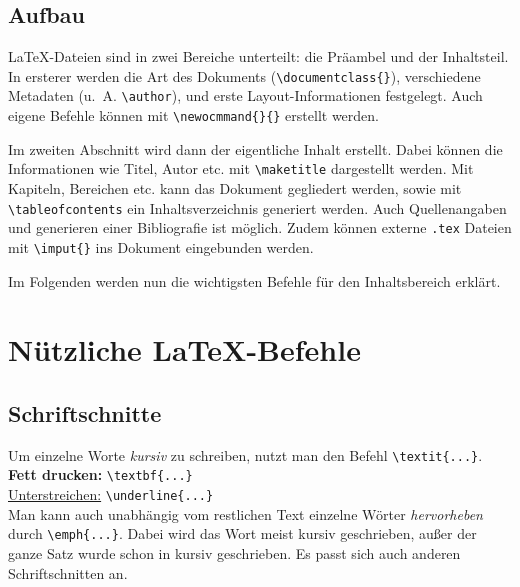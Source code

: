 \documentclass[ngerman]{scrreport}
\begin{document}
\section{Aufbau}

\LaTeX-Dateien sind in zwei Bereiche unterteilt: die Präambel und der Inhaltsteil. In ersterer werden die Art des Dokuments ({\color{blue}\verb|\documentclass{}|}), verschiedene Metadaten (u.~A. {\color{blue}\verb|\author|}), und erste Layout-Informationen festgelegt.
Auch eigene Befehle können mit {\color{blue}\verb|\newocmmand{}{}|} erstellt werden.

Im zweiten Abschnitt wird dann der eigentliche Inhalt erstellt. Dabei können die Informationen wie Titel, Autor etc. mit {\color{blue}\verb|\maketitle|} dargestellt werden. Mit Kapiteln, Bereichen etc. kann das Dokument gegliedert werden, sowie mit {\color{blue}\verb|\tableofcontents|} ein Inhaltsverzeichnis generiert werden.
Auch Quellenangaben und generieren einer Bibliografie ist möglich. Zudem können externe \texttt{.tex} Dateien mit {\color{blue}\verb|\imput{}|} ins Dokument eingebunden werden.

Im Folgenden werden nun die wichtigsten Befehle für den Inhaltsbereich erklärt.

\chapter{\centering Nützliche \LaTeX{}-Befehle}

\section{Schriftschnitte}
Um einzelne Worte \textit{kursiv} zu schreiben, nutzt man den Befehl {\color{blue}\verb|\textit{...}|}.\\
\textbf{Fett drucken:} {\color{blue}\verb|\textbf{...}|}\\
\underline{Unterstreichen:} {\color{blue}\verb|\underline{...}|}\\
Man kann auch unabhängig vom restlichen Text einzelne Wörter \emph{hervorheben} durch {\color{blue}\verb|\emph{...}|}. Dabei wird das Wort meist kursiv geschrieben, außer der ganze Satz wurde schon in kursiv geschrieben. Es passt sich auch anderen Schriftschnitten an.
\end{document}
